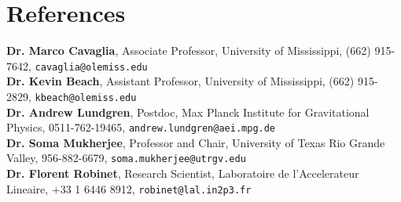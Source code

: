 \section{\sc References}

{\bf Dr. Marco Cavaglia}, Associate Professor, University of Mississippi, (662) 915-7642, \texttt{cavaglia@olemiss.edu}\\

{\bf Dr. Kevin Beach}, Assistant Professor, University of Mississippi, (662) 915-2829, \texttt{kbeach@olemiss.edu}\\

{\bf Dr. Andrew Lundgren}, Postdoc, Max Planck Institute for Gravitational Physics, 0511-762-19465, \texttt{andrew.lundgren@aei.mpg.de}\\

{\bf Dr. Soma Mukherjee}, Professor and Chair, University of Texas Rio Grande Valley, 956-882-6679, \texttt{soma.mukherjee@utrgv.edu}\\

{\bf Dr. Florent Robinet}, Research Scientist, Laboratoire de l'Accelerateur Lineaire, +33 1 6446 8912, \texttt{robinet@lal.in2p3.fr}

\endinput